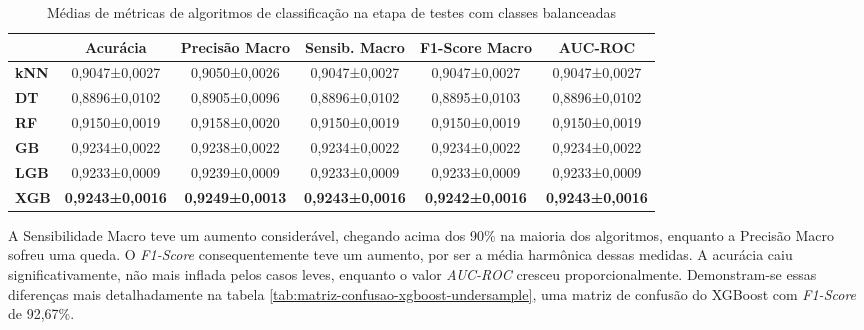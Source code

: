 \begin{table}[H]
  \footnotesize
  \centering
  \begin{tabular}{l|c|c|c|c|c|}
  \cline{2-6}
  \textbf{}                          & \textbf{Acurácia}      & \textbf{Precisão Macro} & \textbf{Sensib. Macro} & \textbf{F1-Score Macro} & \textbf{AUC-ROC}       \\ \hline
  \multicolumn{1}{|l|}{\textbf{kNN}} & 0,9047±0,0027          & 0,9050±0,0026           & 0,9047±0,0027          & 0,9047±0,0027           & 0,9047±0,0027          \\ \hline
  \multicolumn{1}{|l|}{\textbf{DT}}  & 0,8896±0,0102          & 0,8905±0,0096           & 0,8896±0,0102          & 0,8895±0,0103           & 0,8896±0,0102          \\ \hline
  \multicolumn{1}{|l|}{\textbf{RF}}  & 0,9150±0,0019          & 0,9158±0,0020           & 0,9150±0,0019          & 0,9150±0,0019           & 0,9150±0,0019          \\ \hline
  \multicolumn{1}{|l|}{\textbf{GB}}  & 0,9234±0,0022          & 0,9238±0,0022           & 0,9234±0,0022          & 0,9234±0,0022           & 0,9234±0,0022          \\ \hline
  \multicolumn{1}{|l|}{\textbf{LGB}} & 0,9233±0,0009          & 0,9239±0,0009           & 0,9233±0,0009          & 0,9233±0,0009           & 0,9233±0,0009          \\ \hline
  \multicolumn{1}{|l|}{\textbf{XGB}} & \textbf{0,9243±0,0016} & \textbf{0,9249±0,0013}  & \textbf{0,9243±0,0016} & \textbf{0,9242±0,0016}  & \textbf{0,9243±0,0016} \\ \hline
\end{tabular}
\caption{Médias de métricas de algoritmos de classificação na etapa de testes com classes balanceadas}
\label{tab:comparacao-algoritmos-undersample}
\end{table}

A Sensibilidade Macro teve um aumento considerável, chegando acima dos 90\% na maioria dos algoritmos, enquanto a Precisão Macro sofreu uma queda. O \textit{F1-Score} consequentemente teve um aumento, por ser a média harmônica dessas medidas. A acurácia caiu significativamente, não mais inflada pelos casos leves, enquanto o valor \textit{AUC-ROC} cresceu proporcionalmente. Demonstram-se essas diferenças mais detalhadamente na tabela \ref{tab:matriz-confusao-xgboost-undersample}, uma matriz de confusão do XGBoost com \textit{F1-Score} de 92,67\%.

